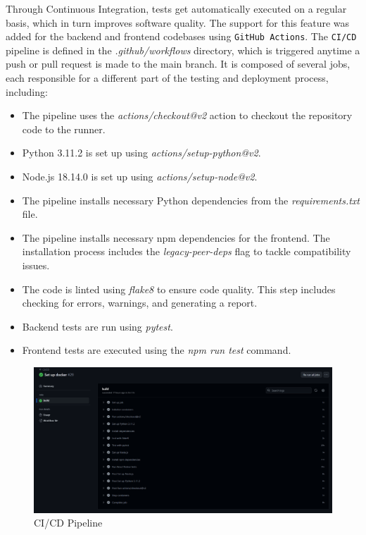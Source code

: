 Through Continuous Integration, tests get automatically executed on a regular basis, which in turn improves software quality. The support for this feature was added for the backend and frontend codebases using \texttt{GitHub Actions}. The \texttt{CI/CD} pipeline is defined in the \textit{.github/workflows} directory, which is triggered anytime a push or pull request is made to the main branch. It is composed of several jobs, each responsible for a different part of the testing and deployment process, including:

\begin{itemize}
    \item The pipeline uses the \textit{actions/checkout@v2} action to checkout the repository code to the runner.
    \item Python 3.11.2 is set up using \textit{actions/setup-python@v2}.
    \item Node.js 18.14.0 is set up using \textit{actions/setup-node@v2}.
    \item The pipeline installs necessary Python dependencies from the \textit{requirements.txt} file.
    \item The pipeline installs necessary npm dependencies for the frontend. The installation process includes the \textit{legacy-peer-deps} flag to tackle compatibility issues.
    \item The code is linted using \textit{flake8} to ensure code quality. This step includes checking for errors, warnings, and generating a report.
    \item Backend tests are run using \textit{pytest}.
    \item Frontend tests are executed using the \textit{npm run test} command.
\end{itemize}

\begin{figure}[!ht]
    \centering
    \includegraphics[width=1\linewidth]{LATEX/Appendices/Images/Pipeline_CI_CD/github_actions_CI_CD_pipeline.png}
    \caption{CI/CD Pipeline}
    \label{fig:CI/CD-Pipeline}
\end{figure}

